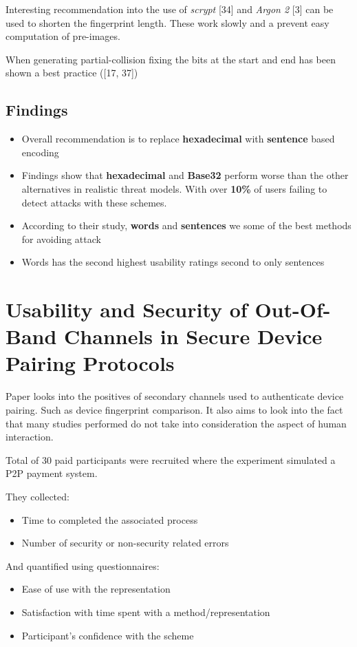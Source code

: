 Interesting recommendation into the use of \textit{scrypt} [34] and \textit{Argon 2} [3] can be used to shorten the fingerprint length. These work slowly and a prevent easy computation of pre-images.

When generating partial-collision fixing the bits at the start and end has been shown a best practice ([17, 37])

\subsection{Findings}
\begin{itemize}
    \item Overall recommendation is to replace \textbf{hexadecimal} with \textbf{sentence} based encoding
    \item Findings show that \textbf{hexadecimal} and \textbf{Base32} perform worse than the other alternatives in realistic threat models. With over \textbf{10\%} of users failing to detect attacks with these schemes.
    \item According to their study, \textbf{words} and \textbf{sentences} we some of the best methods for avoiding attack
    \item Words has the second highest usability ratings second to only sentences
\end{itemize}

\section{Usability and Security of Out-Of-Band Channels in Secure Device Pairing Protocols}

Paper looks into the positives of secondary channels used to authenticate device pairing. Such as device fingerprint comparison. It also aims to look into the fact that many studies performed do not take into consideration the aspect of human interaction.

Total of 30 paid participants were recruited where the experiment simulated a P2P payment system.

They collected:
\begin{itemize}
    \item Time to completed the associated process
    \item Number of security or non-security related errors
\end{itemize}

And quantified using questionnaires:
\begin{itemize}
    \item Ease of use with the representation
    \item Satisfaction with time spent with a method/representation
    \item Participant's confidence with the scheme
\end{itemize}

